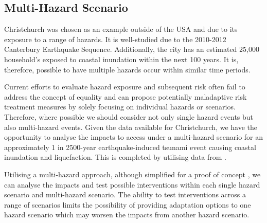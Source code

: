 \documentclass[review,3p,times,onecolumn,sort&compress,12pt]{elsarticle}
\let \cite \parencite
\begin{document}
\subsection{Multi-Hazard Scenario}
Christchurch was chosen as an example outside of the USA and due to its exposure to a range of hazards.
It is well-studied due to the 2010-2012 Canterbury Earthquake Sequence. 
Additionally, the city has an estimated 25,000 household’s exposed to coastal inundation within the next 100 years.
It is, therefore, possible to have multiple hazards occur within similar time periods.

Current efforts to evaluate hazard exposure and subsequent risk often fail to address the concept of equality and can propose potentially maladaptive risk treatment measures by solely focusing on individual hazards or scenarios. 
Therefore, where possible we should consider not only single hazard events but also multi-hazard events.
Given the data available for Christchurch, we have the opportunity to analyse the impacts to access under a multi-hazard scenario for an approximately 1 in 2500-year earthquake-induced tsunami event causing coastal inundation and liquefaction. 
This is completed by utilising data from \cite{Mueller2019-hk, Tonkin_taylor2020-es}.

Utilising a multi-hazard approach, although simplified for a proof of concept \cite{Gehl_undated-rx}, we can analyse the impacts and test possible interventions within each single hazard scenario and multi-hazard scenario.
The ability to test interventions across a range of scenarios limits the possibility of providing adaptation options to one hazard scenario which may worsen the impacts from another hazard scenario.
\end{document}
